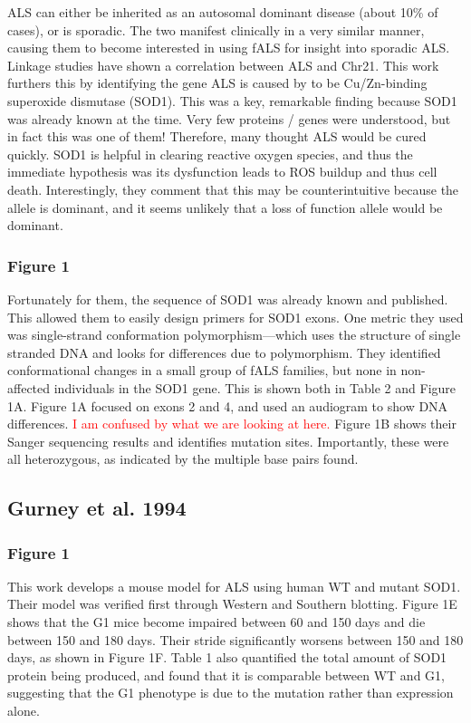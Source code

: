 \documentclass[12pt]{report}
\begin{document}
ALS can either be inherited as an autosomal dominant disease (about 10\% of cases), or is sporadic. The two manifest clinically in a very similar manner, causing them to become interested in using fALS for insight into sporadic ALS. Linkage studies have shown a correlation between ALS and Chr21. This work furthers this by identifying the gene ALS is caused by to be Cu/Zn-binding superoxide dismutase (SOD1). This was a key, remarkable finding because SOD1 was already known at the time. Very few proteins / genes were understood, but in fact this was one of them! Therefore, many thought ALS would be cured quickly. SOD1 is helpful in clearing reactive oxygen species, and thus the immediate hypothesis was its dysfunction leads to ROS buildup and thus cell death. Interestingly, they comment that this may be counterintuitive because the allele is dominant, and it seems unlikely that a loss of function allele would be dominant. \newline

\subsubsection{Figure 1}

Fortunately for them, the sequence of SOD1 was already known and published. This allowed them to easily design primers for SOD1 exons. One metric they used was single-strand conformation polymorphism---which uses the structure of single stranded DNA and looks for differences due to polymorphism. They identified conformational changes in a small group of fALS families, but none in non-affected individuals in the SOD1 gene. This is shown both in Table 2 and Figure 1A. Figure 1A focused on exons 2 and 4, and used an audiogram to show DNA differences. \textcolor{red}{I am confused by what we are looking at here.} Figure 1B shows their Sanger sequencing results and identifies mutation sites. Importantly, these were all heterozygous, as indicated by the multiple base pairs found.\newline

\subsection{Gurney et al. 1994}

\subsubsection{Figure 1}

This work develops a mouse model for ALS using human WT and mutant SOD1. Their model was verified first through Western and Southern blotting. Figure 1E shows that the G1 mice become impaired between 60 and 150 days and die between 150 and 180 days. Their stride significantly worsens between 150 and 180 days, as shown in Figure 1F. Table 1 also quantified the total amount of SOD1 protein being produced, and found that it is comparable between WT and G1, suggesting that the G1 phenotype is due to the mutation rather than expression alone.  
\end{document}
